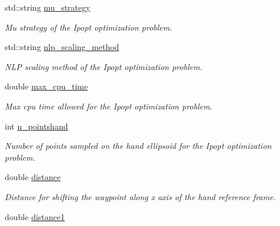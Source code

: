 \begin{DoxyCompactItemize}
\item 
std\+::string \hyperlink{classGraspComputation_ac45140965ecbdce979e455f3e3de7211}{mu\+\_\+strategy}\label{classGraspComputation_ac45140965ecbdce979e455f3e3de7211}

\begin{DoxyCompactList}\small\item\em Mu strategy of the Ipopt optimization problem. \end{DoxyCompactList}\item 
std\+::string \hyperlink{classGraspComputation_a6cf999d26066780519a0f6086b5117aa}{nlp\+\_\+scaling\+\_\+method}\label{classGraspComputation_a6cf999d26066780519a0f6086b5117aa}

\begin{DoxyCompactList}\small\item\em N\+LP scaling method of the Ipopt optimization problem. \end{DoxyCompactList}\item 
double \hyperlink{classGraspComputation_a8a4ee0afa3541485daa338dd25baaa5c}{max\+\_\+cpu\+\_\+time}\label{classGraspComputation_a8a4ee0afa3541485daa338dd25baaa5c}

\begin{DoxyCompactList}\small\item\em Max cpu time allowed for the Ipopt optimization problem. \end{DoxyCompactList}\item 
int \hyperlink{classGraspComputation_afa3a569ce96b4cb1a13020537646ab5a}{n\+\_\+pointshand}\label{classGraspComputation_afa3a569ce96b4cb1a13020537646ab5a}

\begin{DoxyCompactList}\small\item\em Number of points sampled on the hand ellipsoid for the Ipopt optimization problem. \end{DoxyCompactList}\item 
double \hyperlink{classGraspComputation_a0c1bd5e871dfddb9968508fe9bda792c}{distance}\label{classGraspComputation_a0c1bd5e871dfddb9968508fe9bda792c}

\begin{DoxyCompactList}\small\item\em Distance for shifting the waypoint along x axis of the hand reference frame. \end{DoxyCompactList}\item 
double \hyperlink{classGraspComputation_a268253bf8a04a0b05fcb4b02b4af0fbe}{distance1}\label{classGraspComputation_a268253bf8a04a0b05fcb4b02b4af0fbe}


\end{DoxyCompactItemize}

